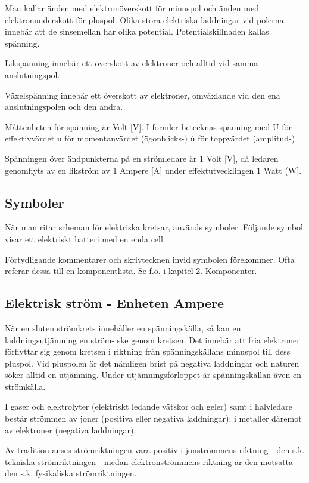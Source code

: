 Man kallar änden med elektronöverskott för minuspol och änden med elektronunderskott för
pluspol. Olika stora elektriska laddningar vid polerna innebär att de sinsemellan har
olika potential. Potentialskillnaden kallas spänning.

Likspänning innebär ett överskott av elektroner och alltid vid samma
anslutningspol.

Växelspänning innebär ett överskott av elektroner, omväxlande vid den ena
anslutningspolen och den andra.

Måttenheten för spänning är Volt [V].
I formler betecknas spänning med
U för effektivvärdet
u för momentanvärdet (ögonblicks-)
û för toppvärdet (amplitud-)

Spänningen över ändpunkterna på en
strömledare är 1 Volt [V], då ledaren
genomflyts av en likström av 1 Ampere
[A] under effektutvecklingen 1 Watt (W].

\subsection{Symboler}

När man ritar scheman för elektriska kretsar, används symboler. Följande symbol visar
ett elektriskt batteri med en enda cell.

Förtydligande kommentarer och skrivtecknen invid symbolen förekommer. Ofta
referar dessa till en komponentlista. Se f.ö. i kapitel 2. Komponenter.

\subsection{Elektrisk ström - Enheten Ampere}

När en sluten strömkrets innehåller en spänningskälla, så kan en laddningsutjämning en
ström- ske genom kretsen. Det innebär att fria elektroner förflyttar sig genom kretsen i
riktning från spänningskällans minuspol till dess pluspol. Vid pluspolen är det nämligen
brist på negativa laddningar och naturen söker alltid en utjämning. Under
utjämningsförloppet är spänningskällan även en strömkälla.

I gaser och elektrolyter (elektriskt ledande vätskor och geler) samt i halvledare består
strömmen av joner (positiva eller negativa laddningar); i metaller däremot av elektroner
(negativa laddningar).

Av tradition anses strömriktningen vara positiv i jonströmmens riktning - den s.k.
tekniska strömriktningen - medan elektronströmmens riktning är den motsatta - den
s.k. fysikaliska strömriktningen.

